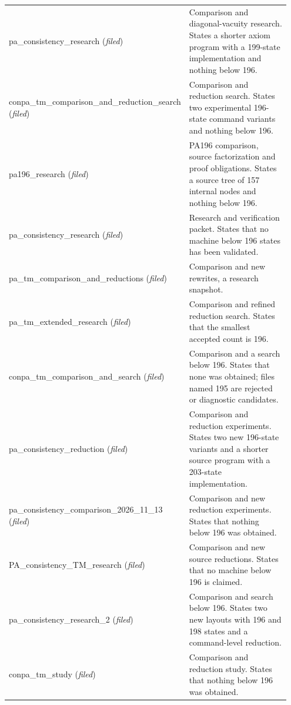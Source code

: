 \begin{longtable}{@{}p{0.33\linewidth}p{0.62\linewidth}@{}}
pa\_\allowbreak{}consistency\_\allowbreak{}research (\emph{filed}) & Comparison and diagonal-vacuity research. States a shorter axiom program with a 199-state implementation and nothing below 196. \\
conpa\_\allowbreak{}tm\_\allowbreak{}comparison\_\allowbreak{}and\_\allowbreak{}reduction\_\allowbreak{}search (\emph{filed}) & Comparison and reduction search. States two experimental 196-state command variants and nothing below 196. \\
pa196\_\allowbreak{}research (\emph{filed}) & PA196 comparison, source factorization and proof obligations. States a source tree of 157 internal nodes and nothing below 196. \\
pa\_\allowbreak{}consistency\_\allowbreak{}research (\emph{filed}) & Research and verification packet. States that no machine below 196 states has been validated. \\
pa\_\allowbreak{}tm\_\allowbreak{}comparison\_\allowbreak{}and\_\allowbreak{}reductions (\emph{filed}) & Comparison and new rewrites, a research snapshot. \\
pa\_\allowbreak{}tm\_\allowbreak{}extended\_\allowbreak{}research (\emph{filed}) & Comparison and refined reduction search. States that the smallest accepted count is 196. \\
conpa\_\allowbreak{}tm\_\allowbreak{}comparison\_\allowbreak{}and\_\allowbreak{}search (\emph{filed}) & Comparison and a search below 196. States that none was obtained; files named 195 are rejected or diagnostic candidates. \\
pa\_\allowbreak{}consistency\_\allowbreak{}reduction (\emph{filed}) & Comparison and reduction experiments. States two new 196-state variants and a shorter source program with a 203-state implementation. \\
pa\_\allowbreak{}consistency\_\allowbreak{}comparison\_\allowbreak{}2026\_\allowbreak{}11\_\allowbreak{}13 (\emph{filed}) & Comparison and new reduction experiments. States that nothing below 196 was obtained. \\
PA\_\allowbreak{}consistency\_\allowbreak{}TM\_\allowbreak{}research (\emph{filed}) & Comparison and new source reductions. States that no machine below 196 is claimed. \\
pa\_\allowbreak{}consistency\_\allowbreak{}research\_\allowbreak{}2 (\emph{filed}) & Comparison and search below 196. States two new layouts with 196 and 198 states and a command-level reduction. \\
conpa\_\allowbreak{}tm\_\allowbreak{}study (\emph{filed}) & Comparison and reduction study. States that nothing below 196 was obtained. \\

\end{longtable}
